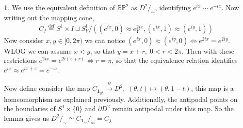 \documentclass[10.5pt]{article}
\theoremstyle{definition}
\newtheorem{pb}{}
\newcommand{\set}[1]{\{#1\}}
\newcommand{\tand}{\text{ and }}
\newcommand{\ism}{\simeq}
\begin{document}
    \begin{pb}
        We use the equivalent definition of \(\mathbb{R}\mathbb{P}^2\) as \(D^2/_\sim\), identifying \(e^{ix} \sim e^{-ix}\). Now writing out the mapping cone,
        \begin{align*}
            C_f \overset{\text{def}}{=} S^1 \times I \sqcup S^1_Y / ((e^{ix},0) \approx e^{2ix}_Y, (e^{ix},1) \approx (e^{iy},1))
        \end{align*}
        Now consider \(x, y \in [0,2\pi)\) we can notice \((e^{ix},0) \approx (e^{iy},0) \iff e^{2ix} = e^{2iy}\). WLOG we can assume \(x < y\), so that \(y = x + r, \; 0 < r < 2\pi\).
        Then with these restrictions \(e^{2ix} = e^{2i(x + r)} \iff r = \pi\), so that the equivalence relation identifies \(e^{ix} \approx e^{ix + \pi} = e^{-ix}\).

        Now define consider the map \(C_{\mathbf{1}_{S^1}} \overset{\psi}{\to} D^2, \; (\theta,t) \mapsto (\theta,1-t)\), this map is a homeomorphism as explained previously.
        Additionally, the antipodal points on the boundaries of 
        \(S^1 \times \set{0} \tand \partial D^2\) remain antipodal under this map. So the lemma gives us \(D^2/_\sim \ism C_{\mathbf{1}_{S^1}}/_\approx = C_f\)
    \end{pb}
\end{document}
